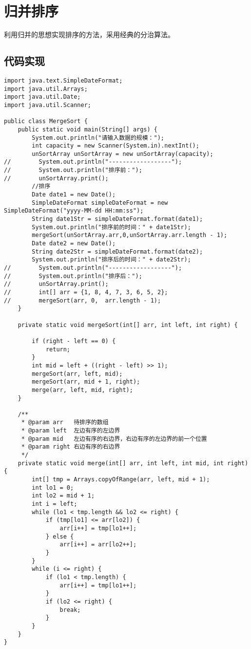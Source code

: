 \documentclass[a4paper]{report}
\begin{document}
\section{归并排序}
利用归并的思想实现排序的方法，采用经典的分治算法。
\subsection{代码实现}
\begin{lstlisting}
import java.text.SimpleDateFormat;
import java.util.Arrays;
import java.util.Date;
import java.util.Scanner;

public class MergeSort {
    public static void main(String[] args) {
        System.out.println("请输入数据的规模：");
        int capacity = new Scanner(System.in).nextInt();
        unSortArray unSortArray = new unSortArray(capacity);
//        System.out.println("------------------");
//        System.out.println("排序前：");
//        unSortArray.print();
        //排序
        Date date1 = new Date();
        SimpleDateFormat simpleDateFormat = new SimpleDateFormat("yyyy-MM-dd HH:mm:ss");
        String date1Str = simpleDateFormat.format(date1);
        System.out.println("排序前的时间：" + date1Str);
        mergeSort(unSortArray.arr,0,unSortArray.arr.length - 1);
        Date date2 = new Date();
        String date2Str = simpleDateFormat.format(date2);
        System.out.println("排序后的时间：" + date2Str);
//        System.out.println("------------------");
//        System.out.println("排序后：");
//        unSortArray.print();
//        int[] arr = {1, 8, 4, 7, 3, 6, 5, 2};
//        mergeSort(arr, 0,  arr.length - 1);
    }

    private static void mergeSort(int[] arr, int left, int right) {

        if (right - left == 0) {
            return;
        }
        int mid = left + ((right - left) >> 1);
        mergeSort(arr, left, mid);
        mergeSort(arr, mid + 1, right);
        merge(arr, left, mid, right);
    }

    /**
     * @param arr   待排序的数组
     * @param left  左边有序的左边界
     * @param mid   左边有序的右边界，右边有序的左边界的前一个位置
     * @param right 右边有序的右边界
     */
    private static void merge(int[] arr, int left, int mid, int right) {
        int[] tmp = Arrays.copyOfRange(arr, left, mid + 1);
        int lo1 = 0;
        int lo2 = mid + 1;
        int i = left;
        while (lo1 < tmp.length && lo2 <= right) {
            if (tmp[lo1] <= arr[lo2]) {
                arr[i++] = tmp[lo1++];
            } else {
                arr[i++] = arr[lo2++];
            }
        }
        while (i <= right) {
            if (lo1 < tmp.length) {
                arr[i++] = tmp[lo1++];
            }
            if (lo2 <= right) {
                break;
            }
        }
    }
}
\end{lstlisting}
\end{document}
